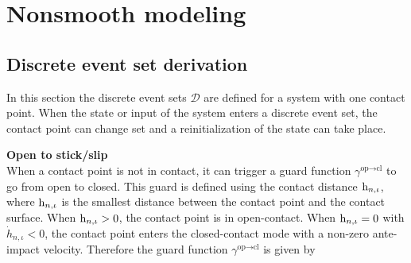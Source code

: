 \documentclass[../DC2019003Bouma.tex]{subfiles}
\begin{document}

\cleartooddpage
\pagestyle{appendix}
\chapter{Nonsmooth modeling}\label{app:nonsmooth}
\section{Discrete event set derivation}\label{app:hybriddisc}
In this section the discrete event sets $\mathcal{D}$ are defined for a system with one contact point. When the state or input of the system enters a discrete event set, the contact point can change set and a reinitialization of the state can take place.

\textbf{Open to stick/slip}\\
When a contact point is not in contact, it can trigger a guard function $\gamma^{\text{op}\rightarrow\text{cl}}$ to go from open to closed. This guard is defined using the contact distance $\mathrm{h}_{n,\iota}$, where $\mathrm{h}_{n,\iota}$ is the smallest distance between the contact point and the contact surface. When $\mathrm{h}_{n,\iota}>0$, the contact point is in open-contact. When $\mathrm{h}_{n,\iota}=0$ with $\dot{h}_{n,\iota}<0$, the contact point enters the closed-contact mode with a non-zero ante-impact velocity. Therefore the guard function $\gamma^{\text{op}\rightarrow\text{cl}}$ is given by
\end{document}
